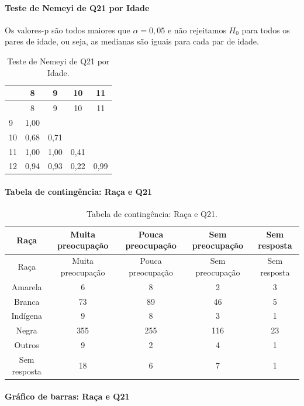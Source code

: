 \documentclass[]{article}
\let\oldparagraph\paragraph
\renewcommand{\paragraph}[1]{\oldparagraph{#1}\mbox{}}
\begin{document}
\hypertarget{teste-de-nemeyi-de-q21-por-idade}{%
\paragraph{Teste de Nemeyi de Q21 por Idade}\label{teste-de-nemeyi-de-q21-por-idade}}

Os valores-p são todos maiores que \(\alpha=0,05\) e não rejeitamos \(H_0\) para todos os pares de idade, ou seja, as medianas são iguais para cada par de idade.

\begin{longtable}[]{@{}lcccc@{}}
\caption{\label{tab:unnamed-chunk-346}Teste de Nemeyi de Q21 por Idade.}\tabularnewline
\toprule
& 8 & 9 & 10 & 11\tabularnewline
\midrule
\endfirsthead
\toprule
& 8 & 9 & 10 & 11\tabularnewline
\midrule
\endhead
9 & 1,00 & & &\tabularnewline
10 & 0,68 & 0,71 & &\tabularnewline
11 & 1,00 & 1,00 & 0,41 &\tabularnewline
12 & 0,94 & 0,93 & 0,22 & 0,99\tabularnewline
\bottomrule
\end{longtable}

\cleardoublepage

\hypertarget{tabela-de-continguxeancia-rauxe7a-e-q21}{%
\paragraph{Tabela de contingência: Raça e Q21}\label{tabela-de-continguxeancia-rauxe7a-e-q21}}

\begin{longtable}[]{@{}ccccc@{}}
\caption{\label{tab:unnamed-chunk-347}Tabela de contingência: Raça e Q21.}\tabularnewline
\toprule
Raça & Muita preocupação & Pouca preocupação & Sem preocupação & Sem resposta\tabularnewline
\midrule
\endfirsthead
\toprule
Raça & Muita preocupação & Pouca preocupação & Sem preocupação & Sem resposta\tabularnewline
\midrule
\endhead
Amarela & 6 & 8 & 2 & 3\tabularnewline
Branca & 73 & 89 & 46 & 5\tabularnewline
Indígena & 9 & 8 & 3 & 1\tabularnewline
Negra & 355 & 255 & 116 & 23\tabularnewline
Outros & 9 & 2 & 4 & 1\tabularnewline
Sem resposta & 18 & 6 & 7 & 1\tabularnewline
\bottomrule
\end{longtable}

\hypertarget{gruxe1fico-de-barras-rauxe7a-e-q21}{%
\paragraph{Gráfico de barras: Raça e Q21}\label{gruxe1fico-de-barras-rauxe7a-e-q21}}
\end{document}
